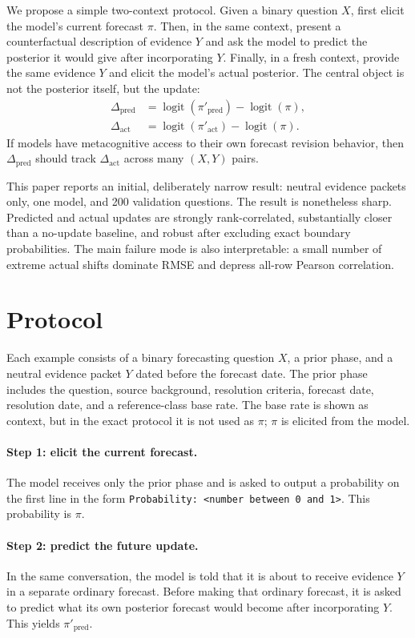 \documentclass[11pt]{article}
\newcommand{\logit}{\operatorname{logit}}
\newcommand{\pred}{\mathrm{pred}}
\newcommand{\act}{\mathrm{act}}
\begin{document}
We propose a simple two-context protocol. Given a binary question $X$, first
elicit the model's current forecast $\pi$. Then, in the same context, present a
counterfactual description of evidence $Y$ and ask the model to predict the
posterior it would give after incorporating $Y$. Finally, in a fresh context,
provide the same evidence $Y$ and elicit the model's actual posterior. The
central object is not the posterior itself, but the update:
\begin{align}
  \Delta_{\pred} &= \logit(\pi'_{\pred}) - \logit(\pi),\\
  \Delta_{\act} &= \logit(\pi'_{\act}) - \logit(\pi).
\end{align}
If models have metacognitive access to their own forecast revision behavior,
then $\Delta_{\pred}$ should track $\Delta_{\act}$ across many $(X,Y)$ pairs.

This paper reports an initial, deliberately narrow result: neutral evidence
packets only, one model, and 200 validation questions. The result is nonetheless
sharp. Predicted and actual updates are strongly rank-correlated, substantially
closer than a no-update baseline, and robust after excluding exact boundary
probabilities. The main failure mode is also interpretable: a small number of
extreme actual shifts dominate RMSE and depress all-row Pearson correlation.

\section{Protocol}

Each example consists of a binary forecasting question $X$, a prior phase, and
a neutral evidence packet $Y$ dated before the forecast date. The prior phase
includes the question, source background, resolution criteria, forecast date,
resolution date, and a reference-class base rate. The base rate is shown as
context, but in the exact protocol it is not used as $\pi$; $\pi$ is elicited
from the model.

\paragraph{Step 1: elicit the current forecast.}
The model receives only the prior phase and is asked to output a probability on
the first line in the form \texttt{Probability: <number between 0 and 1>}. This
probability is $\pi$.

\paragraph{Step 2: predict the future update.}
In the same conversation, the model is told that it is about to receive evidence
$Y$ in a separate ordinary forecast. Before making that ordinary forecast, it is
asked to predict what its own posterior forecast would become after
incorporating $Y$. This yields $\pi'_{\pred}$.
\end{document}
